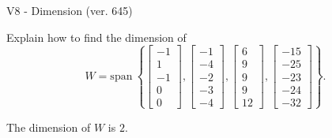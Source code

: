 \begin{exercise}
  \begin{exerciseTitle}V8 - Dimension (ver. 645)\end{exerciseTitle}
  \begin{exerciseStatement}
    Explain how to find the dimension of 
\[W=\mathrm{span}\ \left\{\left[\begin{array}{r}
-1 \\
1 \\
-1 \\
0 \\
0
\end{array}\right] , \left[\begin{array}{r}
-1 \\
-4 \\
-2 \\
-3 \\
-4
\end{array}\right] , \left[\begin{array}{r}
6 \\
9 \\
9 \\
9 \\
12
\end{array}\right] , \left[\begin{array}{r}
-15 \\
-25 \\
-23 \\
-24 \\
-32
\end{array}\right]\right\}.\]



  \end{exerciseStatement}
  \begin{exerciseAnswer}
   The dimension of \(W\) is  \(2\).
  


  \end{exerciseAnswer}
\end{exercise}